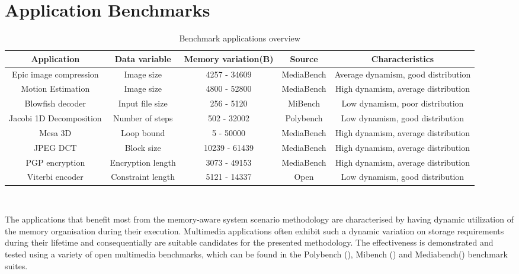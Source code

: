 \documentclass{acm_proc_article-sp}
\begin{document}
\section{Application Benchmarks}
\label{sec:applications}

\begin{center}
\begin{table*}[!t]
\caption{Benchmark applications overview}
\label{tab:applications}
{\small
\hfill{}
\begin{tabular}{|c|c|c|c|c|}
\hline 
\textbf{Application} & \textbf{Data variable} & \textbf{Memory variation(B)} & \textbf{Source} & \textbf{Characteristics}\\ 
\hline 
Epic image compression & Image size & 4257 - 34609 & MediaBench & Average dynamism, good distribution\\ 
\hline 
Motion Estimation & Image size & 4800 - 52800 & MediaBench & High dynamism, average distribution\\ 
\hline 
Blowfish decoder & Input file size & 256 - 5120 & MiBench & Low dynamism, poor distribution\\ 
\hline 
Jacobi 1D Decomposition & Number of steps & 502 - 32002 & Polybench & Low dynamism, good distribution\\ 
\hline 
Mesa 3D & Loop bound & 5 - 50000 & MediaBench & High dynamism, average distribution\\ 
\hline 
JPEG DCT & Block size & 10239 - 61439 & MediaBench & High dynamism, average distribution\\ 
\hline 
PGP encryption & Encryption length & 3073 - 49153 & MediaBench & High dynamism, average distribution\\ 
\hline 
Viterbi encoder & Constraint length & 5121 - 14337 & Open & Low dynamism, good distribution\\ 
\hline 
\end{tabular}}
\hfill{}
\\
\end{table*}
\end{center}

The applications that benefit most from the memory-aware system scenario methodology are characterised by having dynamic utilization of the memory organisation during their execution. Multimedia applications often exhibit such a dynamic variation on storage requirements during their lifetime and consequentially are suitable candidates for the presented methodology. The effectiveness is demonstrated and tested using a variety of open multimedia benchmarks, which can be found in the Polybench (\cite{Poly}), Mibench (\cite{mibench}) and Mediabench(\cite{mediabench}) benchmark suites. 
\end{document}
